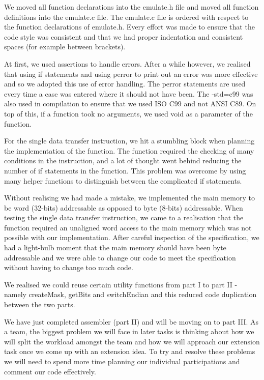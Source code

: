 \documentclass{article}
\begin{document}
We moved all function declarations into the emulate.h file and moved all
function definitions into the emulate.c file. The emulate.c file is ordered
with respect to the function declarations of emulate.h. Every effort was made
to ensure that the code style was consistent and that we had proper
indentation and consistent spaces (for example between brackets).

At first, we used assertions to handle errors. After a while however, we
realised that using if statements and using perror to print out an error was
more effective and so we adopted this use of error handling. The perror
statements are used every time a case was entered where it should not have
been. The -std=c99 was also used in compilation to ensure that we used ISO C99
and not ANSI C89. On top of this, if a function took no arguments, we used
void as a parameter of the function.

For the single data transfer instruction, we hit a stumbling block when
planning the implementation of the function. The function required the
checking of many conditions in the instruction, and a lot of thought went
behind reducing the number of if statements in the function. This problem was
overcome by using many helper functions to distinguish between the complicated
if statements.

Without realising we had made a mistake, we implemented the main memory to be
word (32-bits) addressable as opposed to byte (8-bits) addressable. When
testing the single data transfer instruction, we came to a realisation that
the function required an unaligned word access to the main memory which was
not possible with our implementation. After careful inspection of the
specification, we had a light-bulb moment that the main memory should have
been byte addressable and we were able to change our code to meet the
specification without having to change too much code.

We realised we could reuse certain utility functions from part I to part II -
namely createMask, getBits and switchEndian and this reduced code duplication
between the two parts.

We have just completed assembler (part II) and will be moving on to part III.
As a team, the biggest problem we will face in later tasks is thinking about
how we will split the workload amongst the team and how we will approach our
extension task once we come up with an extension idea. To try and resolve
these problems we will need to spend more time planning our individual
participations and comment our code effectively.
\end{document}
